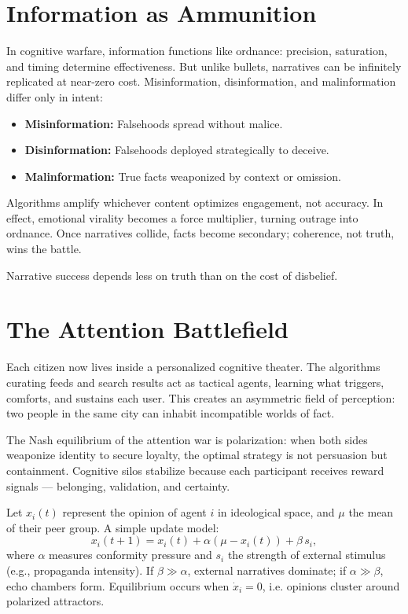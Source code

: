 \documentclass[12pt,twoside]{book}
\begin{document}
\section{Information as Ammunition}

In cognitive warfare, information functions like ordnance: precision, saturation, and timing
determine effectiveness.  
But unlike bullets, narratives can be infinitely replicated at near-zero cost.  
Misinformation, disinformation, and malinformation differ only in intent:
\begin{itemize}
  \item \textbf{Misinformation:} Falsehoods spread without malice.
  \item \textbf{Disinformation:} Falsehoods deployed strategically to deceive.
  \item \textbf{Malinformation:} True facts weaponized by context or omission.
\end{itemize}

Algorithms amplify whichever content optimizes engagement, not accuracy.
In effect, emotional virality becomes a force multiplier, turning outrage into ordnance.  
Once narratives collide, facts become secondary; coherence, not truth, wins the battle.\\

\begin{keyidea}
Narrative success depends less on truth than on the cost of disbelief.
\end{keyidea}

\section{The Attention Battlefield}

Each citizen now lives inside a personalized cognitive theater.  
The algorithms curating feeds and search results act as tactical agents, learning what triggers,
comforts, and sustains each user.  
This creates an asymmetric field of perception: two people in the same city can inhabit
incompatible worlds of fact.

The Nash equilibrium of the attention war is polarization: when both sides weaponize identity to
secure loyalty, the optimal strategy is not persuasion but containment.
Cognitive silos stabilize because each participant receives reward signals — belonging,
validation, and certainty.

\begin{tcolorbox}[colback=gray!5,
  colframe=gray!60,
  boxrule=0.4pt,
  arc=1mm,
  title={Mathematical Interlude: Polarization Dynamics},
  enhanced,
  breakable,
  left=5pt,
  right=5pt]
\small
Let $x_i(t)$ represent the opinion of agent $i$ in ideological space, and $\mu$ the mean of their
peer group.
A simple update model:
\[
x_i(t+1) = x_i(t) + \alpha(\mu - x_i(t)) + \beta\,s_i,
\]
where $\alpha$ measures conformity pressure and $s_i$ the strength of external stimulus (e.g.,
propaganda intensity).  
If $\beta \gg \alpha$, external narratives dominate; if $\alpha \gg \beta$, echo chambers form.  
Equilibrium occurs when $\dot{x}_i = 0$, i.e. opinions cluster around polarized attractors.
\end{tcolorbox}
\end{document}
